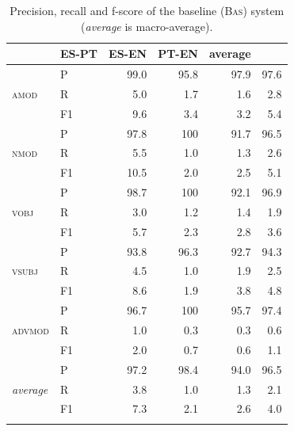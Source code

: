\documentclass[output=paper
,modfonts
,nonflat]{langsci/langscibook}
\begin{document}
\begin{table}
  \begin{center}
    \caption{\label{tab:bas} Precision, recall and f-score of the baseline (\textsc{Bas}) system (\emph{average} is macro-average).}
    \begin{tabular}{llrrrr}
      \lsptoprule
      \multicolumn{2}{l}{\textbf{Pattern}} & \textbf{ES-PT} & \textbf{ES-EN} & \textbf{PT-EN} & \textbf{average}\\
      \midrule
	\multirow{3}{*}{\textsc{amod}} & P & 99.0 & 95.8 & 97.9 & 97.6\\ 
	& R & 5.0 & 1.7 & 1.6 & 2.8\\ 
	& F1 & 9.6 & 3.4 & 3.2 & 5.4\\ \midrule
	\multirow{3}{*}{\textsc{nmod}} & P & 97.8 & 100\phantom{.0} & 91.7 & 96.5\\ 
	& R & 5.5 & 1.0 & 1.3 & 2.6\\ 
	& F1 & 10.5 & 2.0 & 2.5 & 5.1\\  \midrule
	\multirow{3}{*}{\textsc{vobj}} & P & 98.7 & 100\phantom{.0} & 92.1 & 96.9\\ 
	& R & 3.0 & 1.2 & 1.4 & 1.9\\ 
	& F1 & 5.7 & 2.3 & 2.8 & 3.6\\  \midrule
	\multirow{3}{*}{\textsc{vsubj}} & P & 93.8 & 96.3 & 92.7 & 94.3\\ 
	& R & 4.5 & 1.0 & 1.9 & 2.5\\ 
	& F1 & 8.6 & 1.9 & 3.8 & 4.8\\  \midrule
	\multirow{3}{*}{\textsc{advmod}} & P & 96.7 & 100\phantom{.0} & 95.7 & 97.4\\ 
	& R & 1.0 & 0.3 & 0.3 & 0.6\\ 
	& F1 & 2.0 & 0.7 & 0.6 & 1.1\\  \midrule
	\multirow{3}{*}{\emph{average}} & P & 97.2 & 98.4 & 94.0 & 96.5\\ 
	& R & 3.8 & 1.0 & 1.3 & 2.1\\ 
	& F1 & 7.3 & 2.1 & 2.6 & 4.0\\
      \lspbottomrule
    \end{tabular}
  \end{center}
\end{table}
\end{document}
